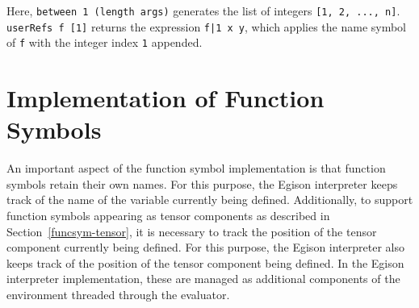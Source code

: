 Here, \lstinline{between 1 (length args)} generates the list of integers \lstinline{[1, 2, ..., n]}.
\lstinline{userRefs f [1]} returns the expression \lstinline{f|1 x y}, which applies the name symbol of \lstinline{f} with the integer index \lstinline{1} appended.

\section{Implementation of Function Symbols}

An important aspect of the function symbol implementation is that function symbols retain their own names.
For this purpose, the Egison interpreter keeps track of the name of the variable currently being defined.
Additionally, to support function symbols appearing as tensor components as described in Section~\ref{funcsym-tensor}, it is necessary to track the position of the tensor component currently being defined.
For this purpose, the Egison interpreter also keeps track of the position of the tensor component being defined.
In the Egison interpreter implementation, these are managed as additional components of the environment threaded through the evaluator.
